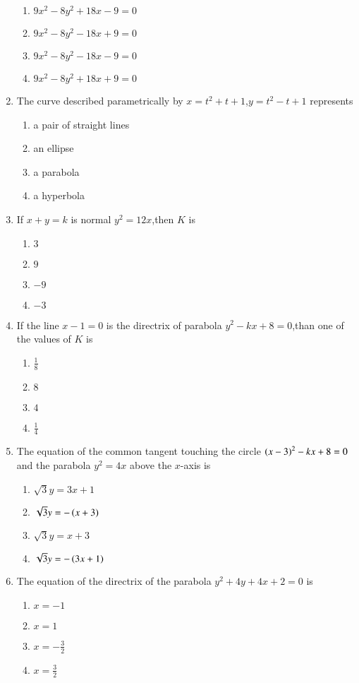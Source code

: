 \documentclass[journal,12pt,twocolumn]{IEEEtran}
\theoremstyle{remark}
\begin{document}
\begin{enumerate}
\begin{enumerate}
    \item $9x^2-8y^2+18x-9=0$
    \item $9x^2-8y^2-18x+9=0$
    \item $9x^2-8y^2-18x-9=0$
    \item $9x^2-8y^2+18x+9=0$
\end{enumerate}
\item The curve described parametrically by $x=t^2+t+1$,$y=t^2-t+1$ represents\hfill{}
\begin{enumerate}
    \item a pair of straight lines
    \item an ellipse
    \item a parabola
    \item a hyperbola\\
\end{enumerate}
\item If $x+y=k$ is normal $y^2=12x$,then $K$ is\hfill{}
\begin{enumerate}
    \item $3$
    \item $9$
    \item $-9$
    \item $-3$\\
\end{enumerate}
\item If the line $x-1=0$ is the directrix of parabola $y^2-kx+8=0$,than one of the values of $K$ is\hfill{}
\begin{enumerate}
    \item $\frac{1}{8}$
    \item $8$
    \item $4$
    \item $\frac{1}{4}$ \\
\end{enumerate}
\item The equation of the common tangent touching the circle $\left(x-3\right)^2-kx+8=0$ and the parabola $y^2=4x$ above the $x$-axis is \hfill{}
\begin{enumerate}
    \item $\sqrt{3}y=3x+1$
    \item $\sqrt{3}y=-\left(x+3\right)$
    \item $\sqrt{3}y=x+3$
    \item $\sqrt{3}y=-\left(3x+1\right)$\\
\end{enumerate}
    \item The equation of the directrix of the parabola $y^2+4y+4x+2=0$ is \hfill {}
\begin{enumerate}
    \item $x=-1$
    \item $x=1$
    \item $x=-\frac{3}{2}$
     \item $x=\frac{3}{2}$
\end{enumerate}
\end{enumerate}
\end{document}
